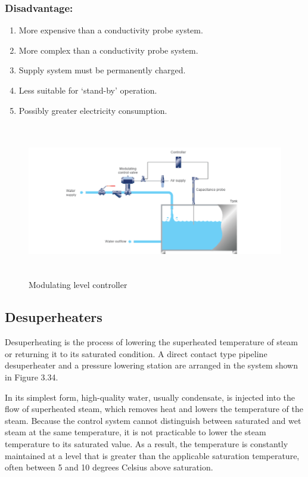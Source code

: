 \subsubsection{Disadvantage:}

\begin{enumerate}
\item
  More expensive than a conductivity probe system.
\item
  More complex than a conductivity probe system.
\item
  Supply system must be permanently charged.
\item
  Less suitable for `stand-by' operation.
\item
  Possibly greater electricity consumption.
\end{enumerate}


\begin{figure}[h!]
  \centering
  \includegraphics[width=6in,height=2.65278in]{figs/control_instrumentation/image6.png}
  \caption{Modulating level controller}
  \label{fig:Modulating level controller}
\end{figure}



\subsection{Desuperheaters}

Desuperheating is the process of lowering the superheated temperature of
steam or returning it to its saturated condition. A direct contact type
pipeline desuperheater and a pressure lowering station are arranged in
the system shown in Figure 3.34.



In its simplest form, high-quality water, usually condensate, is injected
into the flow of superheated steam, which removes heat and lowers the
temperature of the steam. Because the control system cannot distinguish
between saturated and wet steam at the same temperature, it is not
practicable to lower the steam temperature to its saturated value. As a
result, the temperature is constantly maintained at a level that is
greater than the applicable saturation temperature, often between 5 and
10 degrees Celsius above saturation.

